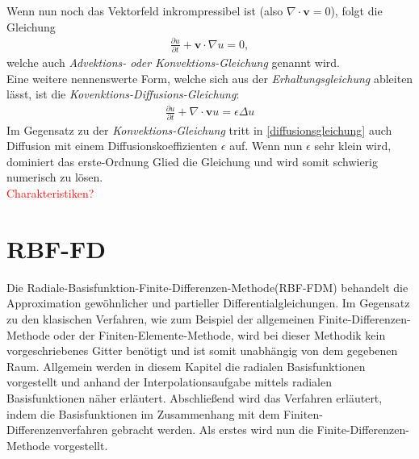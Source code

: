 \documentclass[a4paper,11pt]{article}
\newcommand{\col}[2][red]{\textcolor{#1}{#2}}
\begin{document}
Wenn nun noch das Vektorfeld inkrompressibel ist (also $\nabla \cdot \textbf{v}=0$), folgt die Gleichung
\begin{align}
 \frac{\partial u}{\partial t}+\textbf{v}\cdot\nabla u=0,
\end{align}
welche auch \textit{Advektions- oder Konvektions-Gleichung} genannt wird.\\
Eine weitere nennenswerte Form, welche sich aus der \textit{Erhaltungsgleichung} ableiten lässt, ist die \textit{Kovenktions-Diffusions-Gleichung}:
\begin{align}
 \frac{\partial u}{\partial t}+\nabla \cdot \textbf{v}u = \epsilon\Delta u\label{diffusionsgleichung}
\end{align}
Im Gegensatz zu der \textit{Konvektions-Gleichung} tritt in \eqref{diffusionsgleichung} auch Diffusion mit einem Diffusionskoeffizienten $\epsilon$ auf. Wenn nun $\epsilon$ sehr klein wird, dominiert das erste-Ordnung Glied die Gleichung und wird somit schwierig numerisch zu lösen.\\
\col{Charakteristiken?}
~\cite{segal2013numerik}
\pagebreak
\section{RBF-FD}\label{sec:RBF-FD}
Die Radiale-Basisfunktion-Finite-Differenzen-Methode(RBF-FDM) behandelt die Approximation gewöhnlicher und partieller Differentialgleichungen. Im Gegensatz zu den klasischen Verfahren, wie zum Beispiel der allgemeinen Finite-Differenzen-Methode oder der Finiten-Elemente-Methode, wird bei dieser Methodik kein vorgeschriebenes Gitter benötigt und ist somit unabhängig von dem gegebenen Raum. Allgemein werden in diesem Kapitel die radialen Basisfunktionen vorgestellt und anhand der Interpolationsaufgabe mittels radialen Basisfunktionen näher erläutert. Abschließend wird das Verfahren erläutert, indem die Basisfunktionen im Zusammenhang mit dem Finiten-Differenzenverfahren gebracht werden. Als erstes wird nun die Finite-Differenzen-Methode vorgestellt.
\end{document}
